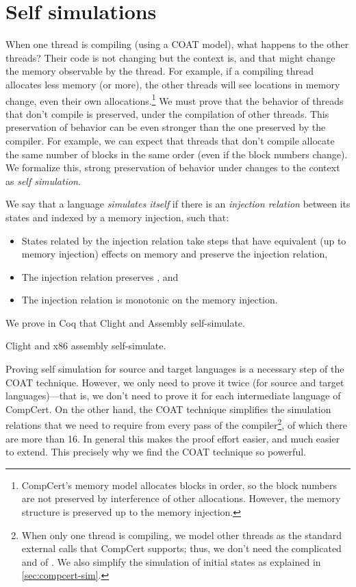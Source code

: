 

\section{Self simulations}\label{sec:selfsim}
When one thread is compiling (using a COAT model), what happens to the other threads? Their code is not changing but the context is, and that might change the memory observable by the thread. For example, if a compiling thread allocates less memory (or more), the other threads will see locations in memory change, even their own allocations.\footnote{CompCert's memory model allocates blocks in order, so the block numbers are not preserved by interference of other allocations. However, the memory structure is preserved up to the memory injection.} We must prove that the behavior of threads that don't compile is preserved, under the compilation of other threads. This preservation of behavior can be even stronger than the one preserved by the compiler. For example, we can expect that threads that don't compile allocate the same number of blocks in the same order (even if the block numbers change). We formalize this, strong preservation of behavior under changes to the context as \emph{self simulation}.

\begin{definition}
We say that a language  \emph{simulates itself} if there is an \emph{injection relation} between its states and indexed by a memory injection, such that:
\begin{itemize}
\item States related by the injection relation take steps that have equivalent (up to memory injection) effects on memory and preserve the injection relation,
\item The injection relation preserves , and
\item The injection relation is monotonic on the memory injection.
\end{itemize}

\end{definition}

We prove in Coq that Clight and Assembly self-simulate.

\begin{lemma}\label{thm:selfsim} Clight and x86 assembly self-simulate. \end{lemma}

Proving self simulation for source and target languages is a necessary step of the COAT technique. However, we only need to prove it twice (for source and target languages)---that is, we don't need to prove it for each intermediate language of CompCert. On the other hand, the COAT technique simplifies the simulation relations that we need to require from every pass of the compiler\footnote{When only one thread is compiling, we model other threads as the standard external calls that CompCert supports; thus, we don't need the complicated  and  of \cite{compcomp}. We also simplify the simulation of initial states as explained in \cref{sec:compcert-sim}.}, of which there are more than 16. In general this makes the proof effort easier, and much easier to extend. This precisely why we find the COAT technique so powerful.
